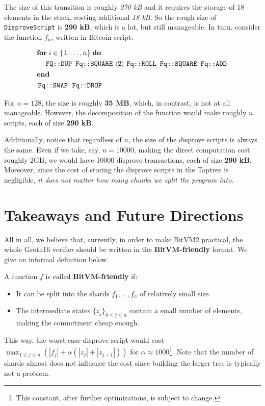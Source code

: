 \documentclass{iacrtrans}
\newcommand{\elem}[1]{\, \langle #1 \rangle \,}
\newcommand{\opcode}[1]{\, \texttt{#1} \,}
\begin{document}
The size of this transition is roughly \textit{270 kB} and it requires the
storage of 18 elements in the stack, costing additional \textit{18 kB}. So the
rough size of \texttt{DisproveScript} is \textbf{290 kB}, which is a lot, but
still manageable. In turn, consider the function $f_n$, written in Bitcoin
script:
\begin{empheqboxed}
  \begin{align*}
    &\textbf{for} \; i \in \{1,\dots,n\} \; \textbf{do} \\
    & \;\;\;\; \opcode{\texttt{FQ::DUP}} \, \opcode{\texttt{Fq::SQUARE}} \elem{2} \opcode{\texttt{Fq::ROLL}} \, \opcode{\texttt{Fq::SQUARE}} \, \opcode{\texttt{Fq::ADD}} \\
    & \textbf{end} \\
    & \opcode{\texttt{Fq::SWAP}} \; \opcode{\texttt{Fq::DROP}}
  \end{align*}
\end{empheqboxed}

For $n=128$, the size is roughly \textbf{35 MB}, which, in contrast, is not at
all manageable. However, the decomposition of the function would make roughly
$n$ scripts, each of size \textbf{290 kB}. 

Additionally, notice that regardless of $n$, the size of the disprove scripts is
always the same. Even if we take, say, $n=10000$, making the direct computation
cost roughly $2\text{GB}$, we would have 10000 disprove transactions, each of
size \textbf{290 kB}. Moreover, since the cost of storing the disprove scripts
in the Taptree is negligible, \emph{it does not matter how many chunks we split
the program into}.

\section{Takeaways and Future Directions}

All in all, we believe that, currently, in order to make BitVM2 practical, the
whole Groth16 verifier should be written in the \textbf{BitVM-friendly} format.
We give an informal definition below.

\begin{definition}
  A function $f$ is called \textbf{BitVM-friendly} if:
  \begin{itemize}
    \item It can be split into the shards $f_1,\dots,f_n$ of relatively small size.
    \item The intermediate states $\{z_j\}_{0 \leq j \leq n}$ contain a small number of elements, making the commitment cheap enough.
  \end{itemize}

  This way, the worst-case disprove script would cost $\max_{1 \leq j \leq
  n}\left(|f_j| + \alpha(|z_j| + |z_{j-1}|)\right)$ for $\alpha \approx
  1000$\footnote{This constant, after further optimizations, is subject to
  change.}. Note that the number of shards almost does not influence the cost
  since building the larger tree is typically not a problem.
\end{definition}
\end{document}
